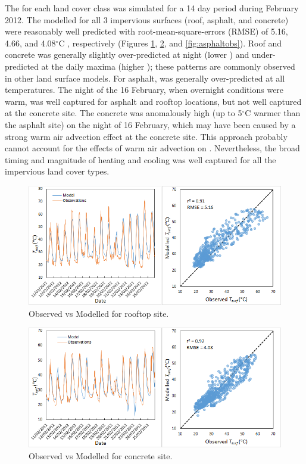 \documentclass[final,3p,times,authoryear]{elsarticle}
\newcommand{\degreeC}{\ensuremath{^\circ}C }
\begin{document}
The  for each land cover class was simulated for a 14 day period during February 2012. The modelled  for all 3 impervious surfaces (roof, asphalt, and concrete) were reasonably well predicted with root-mean-square-errors (RMSE) of 5.16, 4.66, and 4.08\degreeC, respectively (Figures \ref{fig:roofobs}, \ref{fig:concreteobs}, and \ref{fig:asphaltobs}).  Roof and concrete  was generally slightly over-predicted at night (lower ) and under-predicted at the daily maxima (higher ); these patterns are commonly observed in other land surface models.  For asphalt,  was generally over-predicted at all temperatures. The night of the 16 February, when overnight conditions were warm, was well captured for asphalt and rooftop locations, but not well captured at the concrete site. The concrete  was anomalously high (up to 5\degreeC warmer than the asphalt site) on the night of 16 February, which may have been caused by a strong warm air advection effect at the concrete site. This approach probably cannot account for the effects of warm air advection on . Nevertheless, the broad timing and magnitude of heating and cooling was well captured for all the impervious land cover types. 



\begin{figure}[!htbp]
\includegraphics[trim=0mm 0mm 0mm 0mm, clip,scale=0.68]{images/roofobs.png}
 \caption{Observed vs Modelled  for rooftop site.} \label{fig:roofobs}
\end{figure}


\begin{figure}[!htbp]
\includegraphics[trim=0mm 0mm 0mm 0mm, clip,scale=0.68]{images/concreteobs.png}
 \caption{Observed vs Modelled  for concrete site.} \label{fig:concreteobs}
\end{figure}
\end{document}
